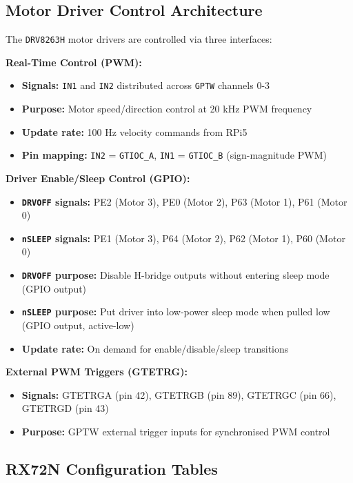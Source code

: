 \subsection{Motor Driver Control Architecture}

The \texttt{DRV8263H} motor drivers are controlled via three interfaces:

\textbf{Real-Time Control (PWM):}
\begin{itemize}
    \item \textbf{Signals:} \texttt{IN1} and \texttt{IN2} distributed across \texttt{GPTW} channels 0-3
    \item \textbf{Purpose:} Motor speed/direction control at 20 kHz PWM frequency
    \item \textbf{Update rate:} 100 Hz velocity commands from RPi5
    \item \textbf{Pin mapping:} \texttt{IN2} = \texttt{GTIOC\_A}, \texttt{IN1} = \texttt{GTIOC\_B} (sign-magnitude PWM)
\end{itemize}

\textbf{Driver Enable/Sleep Control (GPIO):}
\begin{itemize}
    \item \textbf{\texttt{DRVOFF} signals:} PE2 (Motor 3), PE0 (Motor 2), P63 (Motor 1), P61 (Motor 0)
    \item \textbf{\texttt{nSLEEP} signals:} PE1 (Motor 3), P64 (Motor 2), P62 (Motor 1), P60 (Motor 0)
    \item \textbf{\texttt{DRVOFF} purpose:} Disable H-bridge outputs without entering sleep mode (GPIO output)
    \item \textbf{\texttt{nSLEEP} purpose:} Put driver into low-power sleep mode when pulled low (GPIO output, active-low)
    \item \textbf{Update rate:} On demand for enable/disable/sleep transitions
\end{itemize}

\textbf{External PWM Triggers (GTETRG):}
\begin{itemize}
    \item \textbf{Signals:} GTETRGA (pin 42), GTETRGB (pin 89), GTETRGC (pin 66), GTETRGD (pin 43)
    \item \textbf{Purpose:} GPTW external trigger inputs for synchronised PWM control
\end{itemize}

\subsection{RX72N Configuration Tables}

